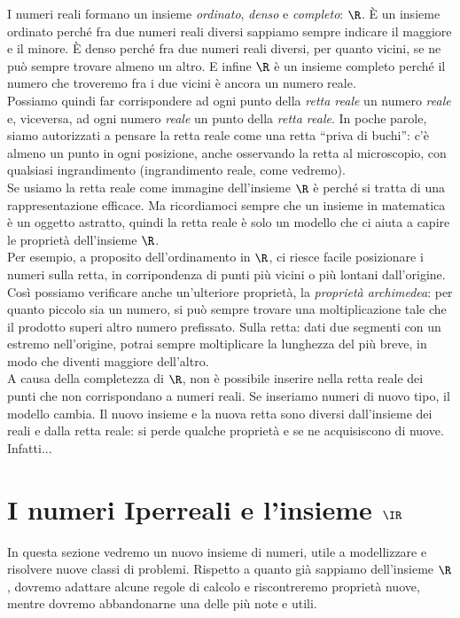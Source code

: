I numeri reali formano un insieme \emph{ordinato}, \emph{denso} e 
\emph{completo}: $\R$. È un insieme ordinato perché fra due numeri reali
diversi sappiamo sempre indicare il maggiore e il minore. È denso
perché fra due numeri reali diversi, per quanto vicini, se ne può 
sempre trovare almeno un altro. E infine \(\R\) è un insieme completo 
perché il numero che troveremo fra i due vicini è ancora un numero reale.\\
Possiamo quindi far corrispondere ad ogni punto della \emph{retta reale} un 
numero \emph{reale} e, viceversa, ad ogni numero \emph{reale} un punto 
della \emph{retta reale}. In poche parole, siamo
autorizzati a pensare la retta reale come una retta ``priva di buchi'':
c'è almeno un punto
in ogni posizione, anche osservando la retta al microscopio, 
con qualsiasi ingrandimento (ingrandimento reale, come vedremo).\\
Se usiamo la retta reale come immagine dell'insieme \(\R\) è perché
si tratta di una rappresentazione efficace. Ma ricordiamoci sempre che un 
insieme 
in matematica è un oggetto astratto, quindi la retta reale è solo
un modello che ci aiuta a capire le proprietà dell'insieme \(\R\).\\
Per esempio, a proposito dell'ordinamento in \(\R\), ci riesce facile
posizionare i numeri sulla retta, in corripondenza di punti più vicini o più 
lontani 
dall'origine. Così possiamo verificare anche un'ulteriore proprietà, la 
\emph{proprietà archimedea}: per quanto piccolo sia un numero, si può 
sempre trovare una moltiplicazione tale che il prodotto superi altro numero
prefissato.
Sulla retta: dati due segmenti con un estremo nell'origine, potrai sempre 
moltiplicare
la lunghezza del più breve, in modo che diventi maggiore dell'altro.\\
A causa della completezza di \(\R\), non è possibile inserire
nella retta reale dei punti che non corrispondano a numeri reali. Se 
inseriamo numeri
di nuovo tipo, il modello cambia. Il nuovo insieme e la nuova retta sono
diversi dall'insieme dei reali e dalla retta reale: si perde qualche 
proprietà 
e se ne acquisiscono di nuove.
Infatti...


\section{I numeri Iperreali e l'insieme $\IR$}
\label{sec:insnum_iperreali}

In questa sezione vedremo un nuovo insieme di numeri, utile a modellizzare e 
risolvere nuove classi di problemi. Rispetto a quanto già sappiamo 
dell'insieme 
\(\R\), dovremo adattare alcune regole di calcolo e riscontreremo proprietà 
nuove, mentre 
dovremo abbandonarne una delle più note e utili. 


